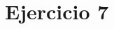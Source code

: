 \documentclass[../../labo_tp5_main.tex]{subfiles}
\begin{document}
\section{Ejercicio 7}
\end{document}
